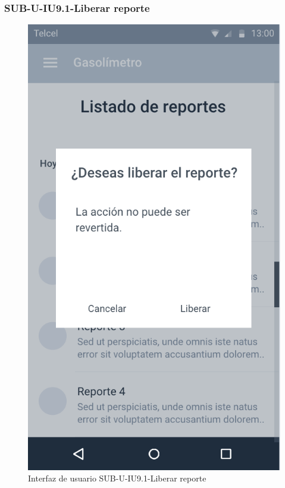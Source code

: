 \subsubsection{SUB-U-IU9.1-Liberar reporte}\label{SUB-U-IU9.1}
\begin{figure}[H]
	\centering
	\includegraphics[scale=1]{Capitulo4/software/submodulos/usuarios/images/sub-u-iu9_1}
	\caption{Interfaz de usuario SUB-U-IU9.1-Liberar reporte}
	\label{fig:sub-u-iu9.1}
\end{figure}